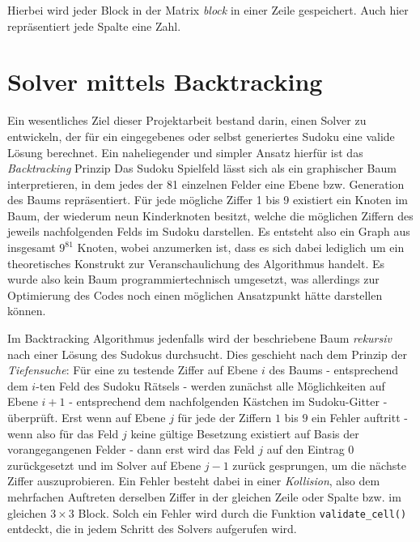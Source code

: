 \documentclass[a4paper,10pt]{article}
\begin{document}
Hierbei wird jeder Block in der Matrix \textit{block} in einer Zeile gespeichert. Auch hier repräsentiert jede Spalte eine Zahl.

\section{Solver mittels Backtracking}
Ein wesentliches Ziel dieser Projektarbeit bestand darin, einen Solver zu entwickeln, der für ein eingegebenes oder selbst generiertes Sudoku eine valide Lösung berechnet. Ein naheliegender und simpler Ansatz hierfür ist das \textit{Backtracking} Prinzip \cite{gitEx} Das Sudoku Spielfeld lässt sich als ein graphischer Baum interpretieren, in dem jedes der 81 einzelnen Felder eine Ebene bzw. Generation des Baums repräsentiert. Für jede mögliche Ziffer 1 bis 9 existiert ein Knoten im Baum, der wiederum neun Kinderknoten besitzt, welche die möglichen Ziffern des jeweils nachfolgenden Felds im Sudoku darstellen. Es entsteht also ein Graph aus insgesamt $9^{81}$ Knoten, wobei anzumerken ist, dass es sich dabei lediglich um ein theoretisches Konstrukt zur Veranschaulichung des Algorithmus handelt. Es wurde also kein Baum programmiertechnisch umgesetzt, was allerdings zur Optimierung des Codes noch einen möglichen Ansatzpunkt hätte darstellen können.

Im Backtracking Algorithmus jedenfalls wird der beschriebene Baum \textit{rekursiv} nach einer Lösung des Sudokus durchsucht. Dies geschieht nach dem Prinzip der \textit{Tiefensuche}: Für eine zu testende Ziffer auf Ebene $i$ des Baums - entsprechend dem $i$-ten Feld des Sudoku Rätsels - werden zunächst alle Möglichkeiten auf Ebene $i+1$ - entsprechend dem nachfolgenden Kästchen im Sudoku-Gitter - überprüft. Erst wenn auf Ebene $j$ für jede der Ziffern $1$ bis $9$ ein Fehler auftritt - wenn also für das Feld $j$ keine gültige Besetzung existiert auf Basis der vorangegangenen Felder - dann erst wird das Feld $j$ auf den Eintrag $0$ zurückgesetzt und im Solver auf Ebene $j-1$ zurück gesprungen, um die nächste Ziffer auszuprobieren. Ein Fehler besteht dabei in einer \textit{Kollision}, also dem mehrfachen Auftreten derselben Ziffer in der gleichen Zeile oder Spalte bzw. im gleichen $3\times3$ Block. Solch ein Fehler wird durch die Funktion \verb|validate_cell()| entdeckt, die in jedem Schritt des Solvers aufgerufen wird.
\end{document}
